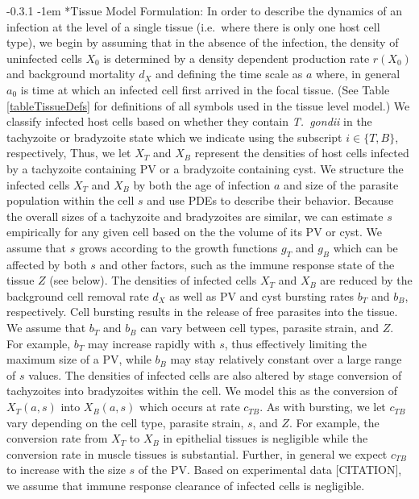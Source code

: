 \documentclass[11pt,fleqn,letterpaper]{article}
\makeatletter
\newcommand{\toxo}{\emph{T.~gondii}\xspace}
\renewcommand{\paragraph}{\@startsection{paragraph}{4}{\z@}%
    {-0.3\baselineskip \@plus0.25\baselineskip \@minus.1\baselineskip}%
    {-1em}%
    {\normalfont\normalsize\bfseries}}
\makeatother
\begin{document}
\paragraph*{Tissue Model Formulation:} %
In order to describe the dynamics of an infection at the level of a single tissue (i.e.~where there is only one host cell type), 
we begin by assuming that in the absence of the infection, the density of uninfected cells $X_0$ is determined by a density dependent production rate $r(X_0)$ and background mortality $d_X$ and defining the time scale as $a$ where, in general $a_0$ is time at which an infected cell first arrived in the focal tissue.
(See Table \ref{tableTissueDefs} for definitions of all symbols used in the tissue level model.)
We classify infected host cells based on whether they contain \toxo in the tachyzoite or bradyzoite state which we indicate using the subscript $i \in \{T, B\}$, respectively,
Thus, we let $X_T$ and $X_B$ represent the densities of host cells infected by a tachyzoite containing PV or a bradyzoite containing cyst.
We structure the infected cells $X_T$ and $X_B$ by both the age of infection $a$ and size of the parasite population within the cell $s$ and use PDEs to describe their behavior.
Because the overall sizes of a tachyzoite and bradyzoites are similar, we can estimate $s$ empirically for any given cell based on the the volume of its PV or cyst.
We assume that $s$ grows according to the growth functions $g_T$ and $g_B$ which can be affected by both $s$ and other factors, such as the immune response state of the tissue $Z$ (see below).
The densities of infected cells $X_T$ and $X_B$ are reduced by the background cell removal rate $d_X$ as well as PV and cyst bursting rates $b_T$ and $b_B$, respectively.
Cell bursting results in the release of free parasites into the tissue.
We assume that $b_T$ and $b_B$ can vary between cell types, parasite strain, and $Z$.
For example, $b_T$ may increase rapidly with $s$, thus effectively limiting the maximum size of a PV, while $b_B$ may stay relatively constant over a large range of $s$ values.
The densities of infected cells are also altered by stage conversion of tachyzoites into bradyzoites within the cell.
We model this as the conversion of $X_T(a,s)$ into $X_B(a,s)$ which occurs at rate $c_{TB}$.
As with bursting, we let $c_{TB}$ vary depending on the cell type, parasite strain, $s$, and $Z$.
For example, the conversion rate from $X_T$ to $X_B$ in epithelial tissues is negligible while the conversion rate in muscle tissues is substantial.
Further, in general we expect $c_{TB}$ to increase with the size $s$ of the PV.
Based on experimental data [CITATION], we assume that immune response clearance of infected cells is negligible.
\end{document}
